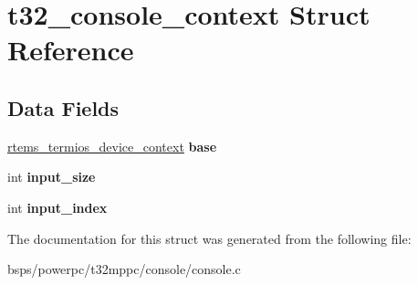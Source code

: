 \hypertarget{structt32__console__context}{}\section{t32\+\_\+console\+\_\+context Struct Reference}
\label{structt32__console__context}
\subsection*{Data Fields}
\begin{DoxyCompactItemize}
\item 
\mbox{\label{structt32__console__context_a7fee0e28eab7dfacf5db6077400dbecb}} 
\mbox{\hyperlink{structrtems__termios__device__context}{rtems\+\_\+termios\+\_\+device\+\_\+context}} {\bfseries base}
\item 
\mbox{\label{structt32__console__context_a4f2818fc4249195f74b053d4688e233c}} 
int {\bfseries input\+\_\+size}
\item 
\mbox{\label{structt32__console__context_aab98eab516448a9abdf34bef810ae648}} 
int {\bfseries input\+\_\+index}
\end{DoxyCompactItemize}


The documentation for this struct was generated from the following file\+:\begin{DoxyCompactItemize}
\item 
bsps/powerpc/t32mppc/console/console.\+c\end{DoxyCompactItemize}
